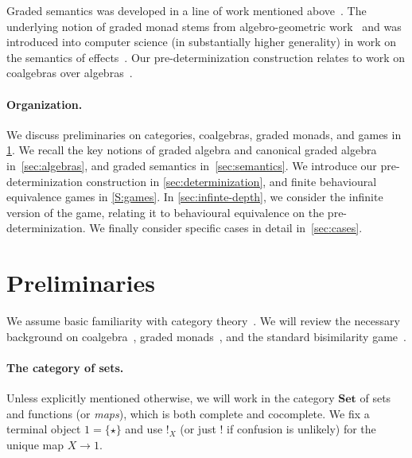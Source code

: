 \documentclass[sigconf,
			final%
			nonacm
                        ]{acmart}
\numberwithin{equation}{section}
\numberwithin{equation}{section}
\theoremstyle{plain}
\theoremstyle{definition}
\newcommand{\Set}{\mathbf{Set}}
\begin{document}
Graded semantics was developed in a line of work mentioned
above~\cite{MPS15,DMS19,FMS21a}. The underlying notion of
graded monad stems from algebro-geometric work~\cite{Smirnov08}
and was introduced into computer science (in substantially higher generality)
in work on the semantics of effects~\cite{Katsumata14}. Our pre-determinization
construction relates to work on coalgebras over algebras~\cite{BK11}.


%
%

\paragraph*{Organization.} We discuss preliminaries on categories,
coalgebras, graded monads, and games in \cref{sec:prelims}. We
recall the key notions of graded algebra and canonical graded algebra
in~\cref{sec:algebras}, and graded semantics in~\cref{sec:semantics}.
We introduce our pre-determinization construction in \cref{sec:determinization},
and finite behavioural equivalence games in \cref{S:games}. In
\cref{sec:infinte-depth}, we consider the infinite version of the
game, relating it to behavioural equivalence on the pre-determinization. We
finally consider specific cases in detail in~\cref{sec:cases}.





\section{Preliminaries}\label{sec:prelims}
We assume basic familiarity with category theory~\cite{AHS90}. We
will review the necessary background on coalgebra~\cite{Rutten00},
graded monads~\cite{Smirnov08,MPS15}, and the standard bisimilarity
game~\cite{Stirling99}.

\paragraph*{The category of sets.}
Unless explicitly mentioned otherwise, we will
work in the category $\Set$ of sets and functions
(or \emph{maps}), which is both complete and
cocomplete. We fix a terminal object $1=\{\star\}$
and use $!_{X}$ (or just $!$ if confusion is
unlikely) for the unique map $X\to 1$.
\end{document}

